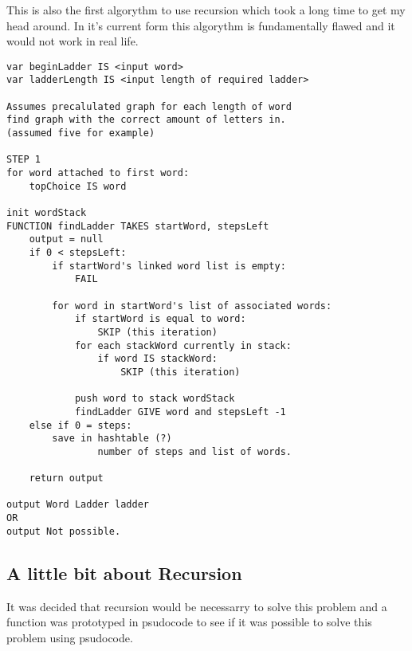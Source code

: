 \documentclass[final,a4paper,twoside,12pt]{report}
\begin{document}
This is also the first algorythm to use recursion which took a long time
to get my head around. In it's current form this algorythm is fundamentally
flawed and it would not work in real life.
\begin{verbatim}
var beginLadder IS <input word>
var ladderLength IS <input length of required ladder>

Assumes precalulated graph for each length of word
find graph with the correct amount of letters in. 
(assumed five for example)

STEP 1
for word attached to first word:
    topChoice IS word
    
init wordStack
FUNCTION findLadder TAKES startWord, stepsLeft
    output = null
    if 0 < stepsLeft:
        if startWord's linked word list is empty:
            FAIL
        
        for word in startWord's list of associated words:
            if startWord is equal to word:
                SKIP (this iteration)
            for each stackWord currently in stack:
                if word IS stackWord:
                    SKIP (this iteration)
                
            push word to stack wordStack
            findLadder GIVE word and stepsLeft -1
    else if 0 = steps:
        save in hashtable (?)
                number of steps and list of words.

    return output

output Word Ladder ladder
OR
output Not possible.
\end{verbatim}

\subsection{A little bit about Recursion}
It was decided that recursion would be necessarry to solve this
problem and a function was prototyped in psudocode to see if it
was possible to solve this problem using psudocode.
\end{document}
